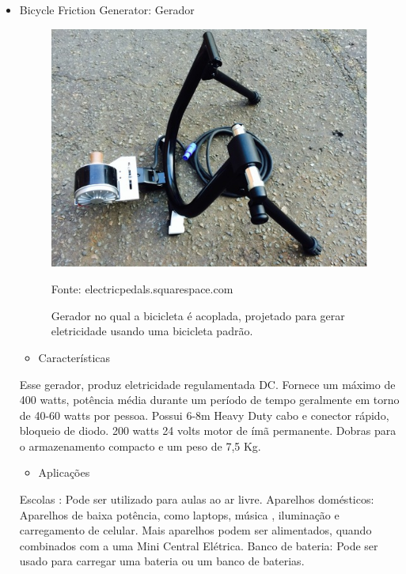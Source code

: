 \pagebreak
\begin{itemize}
	\item Bicycle Friction Generator: Gerador

	\begin{figure}[H]
	 \centering
	\label{Gerador bicicleta}
	 \includegraphics[keepaspectratio=true,scale=0.8]{figuras/bicycle.png}
	 \caption{Gerador no qual a bicicleta é acoplada, projetado para gerar eletricidade usando uma bicicleta padrão.}
	 \small{Fonte: electricpedals.squarespace.com}
	\end{figure}

	\begin{itemize}
	\item Características
	\end{itemize}

		Esse gerador, produz eletricidade regulamentada DC. Fornece um máximo de 400 watts, potência média durante um 	período de tempo geralmente em torno de 40-60 watts por pessoa. Possui 6-8m Heavy Duty cabo e conector rápido, bloqueio de diodo. 200 watts 24 volts motor de ímã permanente. Dobras para o armazenamento compacto e um peso de 7,5 Kg.
	
\begin{itemize}
	\item Aplicações
\end{itemize}	
	
	Escolas : Pode ser utilizado para aulas ao ar livre.
Aparelhos domésticos: Aparelhos de baixa potência, como laptops, música , iluminação e carregamento de celular. Mais aparelhos podem ser alimentados, quando combinados com a uma Mini Central Elétrica.
Banco de bateria: Pode ser usado para carregar uma bateria ou um banco de baterias.

\end{itemize}

